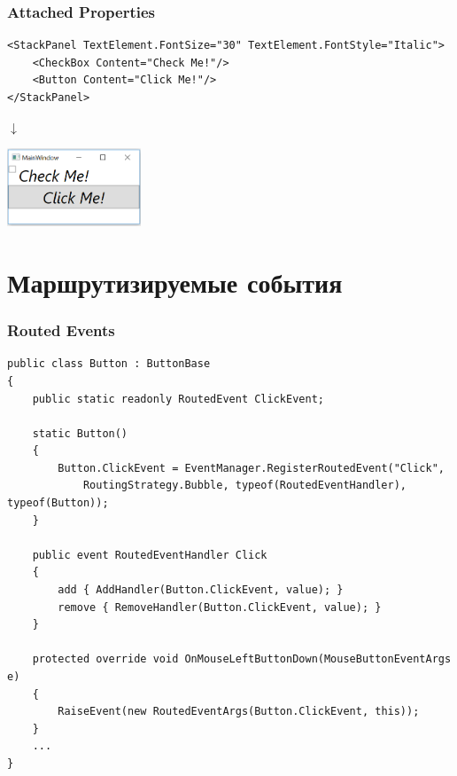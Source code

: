 \documentclass[xetex,mathserif,serif]{beamer}
\begin{document}
    \begin{frame}[fragile]
        \frametitle{Attached Properties}
        \begin{small}
            \begin{verbatim}
<StackPanel TextElement.FontSize="30" TextElement.FontStyle="Italic">
    <CheckBox Content="Check Me!"/>
    <Button Content="Click Me!"/>
</StackPanel>
            \end{verbatim}
        \end{small}
        \begin{center}\begin{LARGE}$\downarrow$\end{LARGE}\end{center}
        \begin{center}
            \includegraphics[width=0.3\textwidth]{fancyWindow.png}
        \end{center}
    \end{frame}

    \section{Маршрутизируемые события}
    
    \begin{frame}[fragile]
        \frametitle{Routed Events}
        \begin{scriptsize}
            \begin{verbatim}
public class Button : ButtonBase
{
    public static readonly RoutedEvent ClickEvent;

    static Button()
    {
        Button.ClickEvent = EventManager.RegisterRoutedEvent("Click",
            RoutingStrategy.Bubble, typeof(RoutedEventHandler), typeof(Button));
    }

    public event RoutedEventHandler Click
    {
        add { AddHandler(Button.ClickEvent, value); }
        remove { RemoveHandler(Button.ClickEvent, value); }
    }

    protected override void OnMouseLeftButtonDown(MouseButtonEventArgs e)
    {
        RaiseEvent(new RoutedEventArgs(Button.ClickEvent, this));
    }
    ...
}
            \end{verbatim}
        \end{scriptsize}
    \end{frame}
\end{document}
